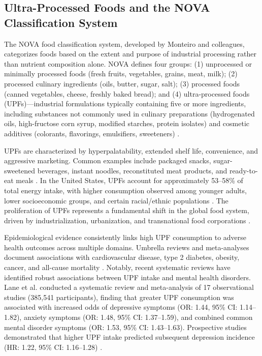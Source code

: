 \documentclass[journal,twoside,10pt]{IEEEtran}
\begin{document}
\subsection{Ultra-Processed Foods and the NOVA Classification System}

The NOVA food classification system, developed by Monteiro and colleagues, categorizes foods based on the extent and purpose of industrial processing rather than nutrient composition alone. NOVA defines four groups: (1) unprocessed or minimally processed foods (fresh fruits, vegetables, grains, meat, milk); (2) processed culinary ingredients (oils, butter, sugar, salt); (3) processed foods (canned vegetables, cheese, freshly baked bread); and (4) ultra-processed foods (UPFs)---industrial formulations typically containing five or more ingredients, including substances not commonly used in culinary preparations (hydrogenated oils, high-fructose corn syrup, modified starches, protein isolates) and cosmetic additives (colorants, flavorings, emulsifiers, sweeteners) \cite{ref48,ref50}.

UPFs are characterized by hyperpalatability, extended shelf life, convenience, and aggressive marketing. Common examples include packaged snacks, sugar-sweetened beverages, instant noodles, reconstituted meat products, and ready-to-eat meals \cite{ref1,ref46}. In the United States, UPFs account for approximately 53--58\% of total energy intake, with higher consumption observed among younger adults, lower socioeconomic groups, and certain racial/ethnic populations \cite{ref18,ref49}. The proliferation of UPFs represents a fundamental shift in the global food system, driven by industrialization, urbanization, and transnational food corporations \cite{ref32,ref45}.

Epidemiological evidence consistently links high UPF consumption to adverse health outcomes across multiple domains. Umbrella reviews and meta-analyses document associations with cardiovascular disease, type 2 diabetes, obesity, cancer, and all-cause mortality \cite{ref29,ref30,ref33,ref34,ref44}. Notably, recent systematic reviews have identified robust associations between UPF intake and mental health disorders. Lane et al. \cite{ref21} conducted a systematic review and meta-analysis of 17 observational studies (385,541 participants), finding that greater UPF consumption was associated with increased odds of depressive symptoms (OR: 1.44, 95\% CI: 1.14--1.82), anxiety symptoms (OR: 1.48, 95\% CI: 1.37--1.59), and combined common mental disorder symptoms (OR: 1.53, 95\% CI: 1.43--1.63). Prospective studies demonstrated that higher UPF intake predicted subsequent depression incidence (HR: 1.22, 95\% CI: 1.16--1.28) \cite{ref21}.
\end{document}
